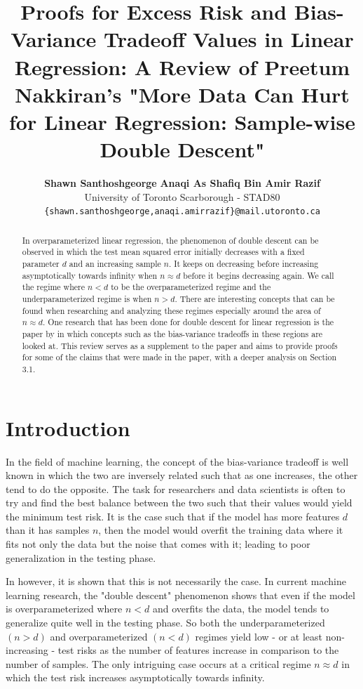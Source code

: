 \documentclass{article}
\title{
    Proofs for Excess Risk and Bias-Variance Tradeoff Values in Linear Regression: A Review of 
    Preetum Nakkiran's "More Data Can Hurt for Linear Regression: Sample-wise Double Descent"
}
\author{%
    \textbf{Shawn Santhoshgeorge} \quad \textbf{Anaqi As Shafiq Bin Amir Razif} \\
    University of Toronto Scarborough - STAD80 \\
    \texttt{\{shawn.santhoshgeorge,anaqi.amirrazif\}@mail.utoronto.ca}
}
\begin{document}
\maketitle
\begin{abstract}
    In overparameterized linear regression, the phenomenon of double descent can be observed in which the test mean squared error initially decreases with a fixed parameter $d$ and an increasing sample $n$. It keeps on decreasing before increasing asymptotically towards infinity when $n \approx d$ before it begins decreasing again. We call the regime where $n<d$ to be the overparameterized regime and the underparameterized regime is when $n > d$. There are interesting concepts that can be found when researching and analyzing these regimes especially around the area of $n \approx d$. One research that has been done for double descent for linear regression is the paper by \cite{Nakkiran_2019} in which concepts such as the bias-variance tradeoffs in these regions are looked at. This review serves as a supplement to the \cite{Nakkiran_2019} paper and aims to provide proofs for some of the claims that were made in the paper, with a deeper analysis on Section 3.1.
\end{abstract}
\section{Introduction}

In the field of machine learning, the concept of the bias-variance tradeoff is well known in which the two are inversely related such that as one increases, the other tend to do the opposite. The task for researchers and data scientists is often to try and find the best balance between the two such that their values would yield the minimum test risk. It is the case such that if the model has more features $d$ than it has samples $n$, then the model would overfit the training data where it fits not only the data but the noise that comes with it; leading to poor generalization in the testing phase.

In \cite{Nakkiran_2019} however, it is shown that this is not necessarily the case. In current machine learning research, the "double descent" phenomenon shows that even if the model is overparameterized where $n < d$ and overfits the data, the model tends to generalize quite well in the testing phase. So both the underparameterized $(n > d)$ and overparameterized $(n < d)$ regimes yield low - or at least non-increasing - test risks as the number of features increase in comparison to the number of samples. The only intriguing case occurs at a critical regime $n \approx d$ in which the test risk increases asymptotically towards infinity. 
\end{document}
